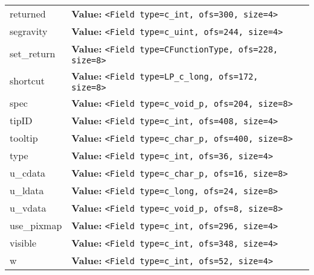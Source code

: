 \begin{longtable}{|p{\varnamewidth}|p{\vardescrwidth}|l}
\cline{1-2}
\raggedright r\-e\-t\-u\-r\-n\-e\-d\- & \raggedright \textbf{Value:} 
{\tt {\textless}Field type=c\_int, ofs=300, size=4{\textgreater}}&\\
\cline{1-2}
\raggedright s\-e\-g\-r\-a\-v\-i\-t\-y\- & \raggedright \textbf{Value:} 
{\tt {\textless}Field type=c\_uint, ofs=244, size=4{\textgreater}}&\\
\cline{1-2}
\raggedright s\-e\-t\-\_\-r\-e\-t\-u\-r\-n\- & \raggedright \textbf{Value:} 
{\tt {\textless}Field type=CFunctionType, ofs=228, size=8{\textgreater}}&\\
\cline{1-2}
\raggedright s\-h\-o\-r\-t\-c\-u\-t\- & \raggedright \textbf{Value:} 
{\tt {\textless}Field type=LP\_c\_long, ofs=172, size=8{\textgreater}}&\\
\cline{1-2}
\raggedright s\-p\-e\-c\- & \raggedright \textbf{Value:} 
{\tt {\textless}Field type=c\_void\_p, ofs=204, size=8{\textgreater}}&\\
\cline{1-2}
\raggedright t\-i\-p\-I\-D\- & \raggedright \textbf{Value:} 
{\tt {\textless}Field type=c\_int, ofs=408, size=4{\textgreater}}&\\
\cline{1-2}
\raggedright t\-o\-o\-l\-t\-i\-p\- & \raggedright \textbf{Value:} 
{\tt {\textless}Field type=c\_char\_p, ofs=400, size=8{\textgreater}}&\\
\cline{1-2}
\raggedright t\-y\-p\-e\- & \raggedright \textbf{Value:} 
{\tt {\textless}Field type=c\_int, ofs=36, size=4{\textgreater}}&\\
\cline{1-2}
\raggedright u\-\_\-c\-d\-a\-t\-a\- & \raggedright \textbf{Value:} 
{\tt {\textless}Field type=c\_char\_p, ofs=16, size=8{\textgreater}}&\\
\cline{1-2}
\raggedright u\-\_\-l\-d\-a\-t\-a\- & \raggedright \textbf{Value:} 
{\tt {\textless}Field type=c\_long, ofs=24, size=8{\textgreater}}&\\
\cline{1-2}
\raggedright u\-\_\-v\-d\-a\-t\-a\- & \raggedright \textbf{Value:} 
{\tt {\textless}Field type=c\_void\_p, ofs=8, size=8{\textgreater}}&\\
\cline{1-2}
\raggedright u\-s\-e\-\_\-p\-i\-x\-m\-a\-p\- & \raggedright \textbf{Value:} 
{\tt {\textless}Field type=c\_int, ofs=296, size=4{\textgreater}}&\\
\cline{1-2}
\raggedright v\-i\-s\-i\-b\-l\-e\- & \raggedright \textbf{Value:} 
{\tt {\textless}Field type=c\_int, ofs=348, size=4{\textgreater}}&\\
\cline{1-2}
\raggedright w\- & \raggedright \textbf{Value:} 
{\tt {\textless}Field type=c\_int, ofs=52, size=4{\textgreater}}&\\

\end{longtable}
